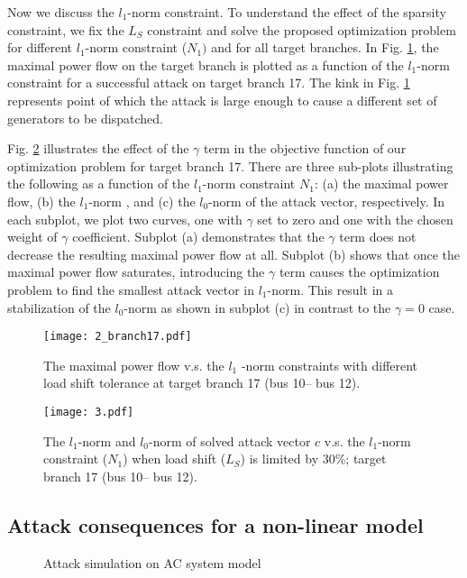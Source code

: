 \documentclass[twocolumn,english,final,journal]{IEEEtran}
\theoremstyle{plain}
\theoremstyle{definition}
\begin{document}
Now we discuss the $l_{1}$-norm constraint. To understand the effect
of the sparsity constraint, we fix the $L_{S}$ constraint and solve the proposed optimization problem for different $l_{1}$-norm
constraint ($N_{1})$ and for all target branches. In Fig. \ref{fig:Branch 17 _Pmx},
the maximal power flow on the target branch is plotted as a function
of the $l_{1}$-norm constraint for a successful attack on target
branch 17. The kink in Fig. \ref{fig:Branch 17 _Pmx} represents point of which the attack is large enough to cause a different set of generators to be dispatched.

Fig. \ref{fig:Branch17_L0L1} illustrates the effect of the $\gamma$
term in the objective function of our optimization problem for target
branch 17. There are three sub-plots  illustrating
the following as a function of the $l_{1}$-norm constraint $N_{1}$:
(a) the maximal power flow, (b) the $l_{1}$-norm , and (c) the $l_{0}$-norm
of the attack vector, respectively. In each subplot, we plot two curves,
one with $\gamma$ set to zero and one with the chosen weight of $\gamma$
coefficient. Subplot (a) demonstrates that the $\gamma$ term does
not decrease the resulting maximal power flow at all. Subplot (b) shows that
once the maximal power flow saturates,  introducing the $\gamma$ term causes
the optimization problem to find the smallest attack vector in $l_{1}$-norm.
This result in a stabilization of the $l_{0}$-norm as shown in subplot
(c) in contrast to the $\gamma=0$ case.

\begin{figure}[h]
\texttt{[image: 2\_branch17.pdf]}
\caption{The maximal power flow v.s. the $l_{1}$ -norm constraints with different
load shift tolerance at target branch 17 (bus 10-- bus 12).\label{fig:Branch 17 _Pmx} }
\end{figure}


\begin{figure}[tbh]
\texttt{[image: 3.pdf]}
\caption{The $l_{1}$-norm and $l_{0}$-norm of solved attack vector $c$ v.s.
the $l_{1}$-norm constraint ($N_{1}$) when load shift ($L_{S}$)
is limited by 30\%; target branch 17 (bus 10-- bus 12).\label{fig:Branch17_L0L1}}
\end{figure}

\subsection{Attack consequences for a non-linear model\label{sub:Simulation-of-consequences}}

\begin{figure}[tbh]

\caption{Attack simulation on AC system model\label{fig:AC attack }}
\label{Fig:AC_DC_Compare}
\end{figure}
\end{document}
